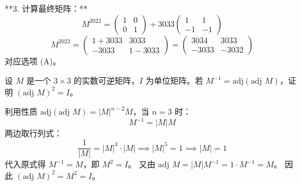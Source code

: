 \begin{questions}
\begin{solution}
**3. 计算最终矩阵：**
\[
M^{2022} = \begin{pmatrix} 1 & 0 \\ 0 & 1 \end{pmatrix} + 3033 \begin{pmatrix} 1 & 1 \\ -1 & -1 \end{pmatrix}
\]
\[
M^{2022} = \begin{pmatrix} 1 + 3033 & 3033 \\ -3033 & 1 - 3033 \end{pmatrix} = \begin{pmatrix} 3034 & 3033 \\ -3033 & -3032 \end{pmatrix}
\]
对应选项 (A)。
\end{solution}

\question 设 $M$ 是一个 $3 \times 3$ 的实数可逆矩阵，$I$ 为单位矩阵。若 $M^{-1} = \text{adj}(\text{adj } M)$，证明 $(\text{adj } M)^2 = I$。

\begin{solution}
利用性质 $\text{adj}(\text{adj } M) = |M|^{n-2} M$，当 $n=3$ 时：
\[ M^{-1} = |M| M \]
两边取行列式：
\[ \frac{1}{|M|} = |M|^3 \cdot |M| \implies |M|^5 = 1 \implies |M| = 1 \]
代入原式得 $M^{-1} = M$，即 $M^2 = I$。
又由 $\text{adj } M = |M| M^{-1} = 1 \cdot M^{-1} = M$。
因此 $(\text{adj } M)^2 = M^2 = I$。
\end{solution}


\end{questions}
